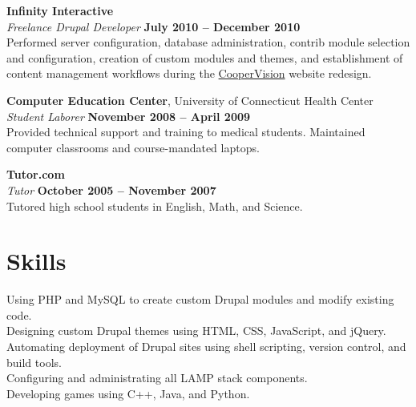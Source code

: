 \documentclass[margin,line]{resume}
\begin{document}
\begin{resume}
    \textbf{Infinity Interactive} \vspace{2mm}\\\vspace{1mm}%
    \textsl{Freelance Drupal Developer} \hfill \textbf{July 2010 -- December 2010}\\
    Performed server configuration, database administration, contrib module selection and configuration, creation of custom modules and themes, and establishment of content management workflows during the \href{http://www.coopervision.com}{CooperVision} website redesign.

    \textbf{Computer Education Center}, University of Connecticut Health Center\vspace{2mm}\\\vspace{1mm}%
    \textsl{Student Laborer} \hfill \textbf{November 2008 -- April 2009}\\
    Provided technical support and training to medical students. Maintained computer classrooms and course-mandated laptops.

    \textbf{Tutor.com}\vspace{2mm}\\\vspace{1mm}%
    \textsl{Tutor} \hfill \textbf{October 2005 -- November 2007}\\
    Tutored high school students in English, Math, and Science.

    \section{\mysidestyle Skills} 

    Using PHP and MySQL to create custom Drupal modules and modify existing code.\vspace{1mm}\\%
    Designing custom Drupal themes using HTML, CSS, JavaScript, and jQuery.\vspace{1mm}\\%
    Automating deployment of Drupal sites using shell scripting, version control, and build tools.\vspace{1mm}\\%
    Configuring and administrating all LAMP stack components.\vspace{1mm}\\%
    Developing games using C++, Java, and Python.\vspace{1mm}\\%

\end{resume}
\end{document}
